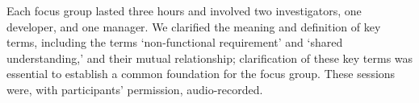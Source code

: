 \documentclass[smallextended]{svjour3}       %
\begin{document}
Each focus group lasted three hours and involved two investigators, one developer, and one manager.
We clarified the meaning and definition of key terms, including the terms `non-functional requirement' and `shared understanding,'  
and their mutual relationship; clarification of these key terms was essential to establish a common foundation for the focus group.
These sessions were, with participants' permission, audio-recorded. 











\end{document}
